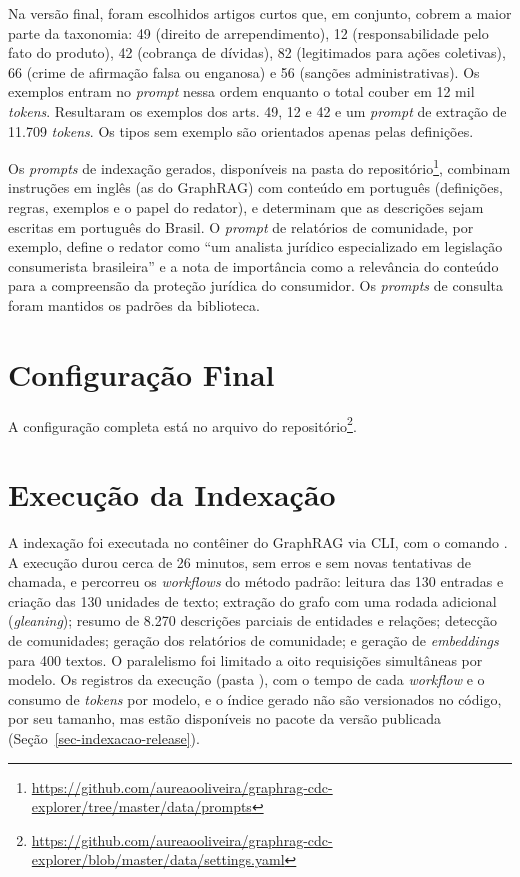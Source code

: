 Na versão final, foram escolhidos artigos curtos que, em conjunto, cobrem a maior parte da taxonomia: 49 (direito de arrependimento), 12 (responsabilidade pelo fato do produto), 42 (cobrança de dívidas), 82 (legitimados para ações coletivas), 66 (crime de afirmação falsa ou enganosa) e 56 (sanções administrativas). Os exemplos entram no \textit{prompt} nessa ordem enquanto o total couber em 12 mil \textit{tokens}. Resultaram os exemplos dos arts. 49, 12 e 42 e um \textit{prompt} de extração de 11.709 \textit{tokens}. Os tipos sem exemplo são orientados apenas pelas definições.

Os \textit{prompts} de indexação gerados, disponíveis na pasta  do repositório\footnote{\url{https://github.com/aureaooliveira/graphrag-cdc-explorer/tree/master/data/prompts}}, combinam instruções em inglês (as do GraphRAG) com conteúdo em português (definições, regras, exemplos e o papel do redator), e determinam que as descrições sejam escritas em português do Brasil. O \textit{prompt} de relatórios de comunidade, por exemplo, define o redator como ``um analista jurídico especializado em legislação consumerista brasileira'' e a nota de importância como a relevância do conteúdo para a compreensão da proteção jurídica do consumidor. Os \textit{prompts} de consulta foram mantidos os padrões da biblioteca.

\section{Configuração Final}
\label{sec-indexacao-config}

A configuração completa está no arquivo  do repositório\footnote{\url{https://github.com/aureaooliveira/graphrag-cdc-explorer/blob/master/data/settings.yaml}}.

\section{Execução da Indexação}
\label{sec-indexacao-execucao}

A indexação foi executada no contêiner do GraphRAG via CLI, com o comando . A execução durou cerca de 26 minutos, sem erros e sem novas tentativas de chamada, e percorreu os \textit{workflows} do método padrão: leitura das 130 entradas e criação das 130 unidades de texto; extração do grafo com uma rodada adicional (\textit{gleaning}); resumo de 8.270 descrições parciais de entidades e relações; detecção de comunidades; geração dos relatórios de comunidade; e geração de \textit{embeddings} para 400 textos. O paralelismo foi limitado a oito requisições simultâneas por modelo. Os registros da execução (pasta ), com o tempo de cada \textit{workflow} e o consumo de \textit{tokens} por modelo, e o índice gerado não são versionados no código, por seu tamanho, mas estão disponíveis no pacote da versão publicada (Seção~\ref{sec-indexacao-release}).

